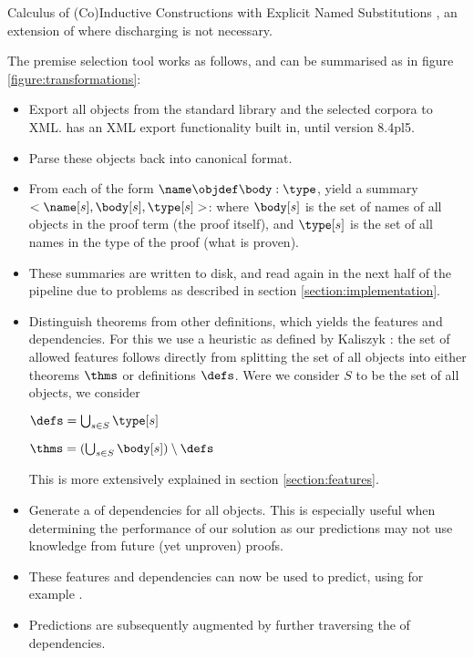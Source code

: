 \begin{definition}[\acic]
	Calculus of (Co)Inductive Constructions with Explicit Named Substitutions \cite{coen2000progettazione},
	an extension of \cic where discharging is not necessary.
\end{definition}

The premise selection tool works as follows, and can be summarised as in figure \ref{figure:transformations}:
\begin{itemize}
    \item Export all \coq objects from the standard library and the selected corpora to XML.
		\coq has an XML export functionality built in, until version 8.4pl5.
	\item Parse these objects back into canonical \acic{} format.
	\item From each \coqobj[s] of the form $\name \objdef \body : \type$, yield a summary $<\name[s], \body[s], \type[s]>$:
		where $\body[s]$  is the set of names of all objects in the proof term (the proof itself),
		and $\type[s]$  is the set of all names in the type of the proof (what is proven).
	\item These summaries are written to disk, and read again in the next half of the pipeline due to problems as described in section \ref{section:implementation}.
	\item Distinguish theorems from other definitions, which yields the features and dependencies.
		For this we use a heuristic as defined by Kaliszyk \cite{kaliszyk2014machine}:
		the set of allowed features follows directly from splitting the set of all objects into either theorems $\thms$ or definitions $\defs$.
		Were we consider $S$ to be the set of all \coq objects, we consider
		\begin{definition}
			$\defs = \bigcup_{s \in S} \type[s]$
		\end{definition}
		\begin{definition}
			$\thms = (\bigcup_{s \in S} \body[s]) \setminus \defs$
		\end{definition}
		This is more extensively explained in section \ref{section:features}.
    \item Generate a \dagraph of dependencies for all \coq objects.
		This is especially useful when determining the performance of our solution as our predictions may not use
		knowledge from future (yet unproven) proofs.
	\item These features and dependencies can now be used to predict, using for example \knn.
	\item Predictions are subsequently augmented by further traversing the \dagraph of dependencies.
\end{itemize}

